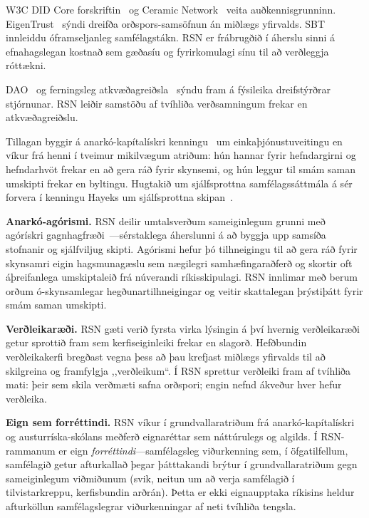 \documentclass[11pt,a4paper,twocolumn]{article}
\begin{document}
W3C DID Core forskriftin~\cite{did2022} og Ceramic Network~\cite{ceramic2023} veita auðkennisgrunninn. EigenTrust~\cite{kamvar2003} sýndi dreifða orðspors-samsöfnun án miðlægs yfirvalds. SBT~\cite{weyl2022} innleiddu óframseljanleg samfélagstákn. RSN er frábrugðið í áherslu sinni á efnahagslegan kostnað sem gæðasíu og fyrirkomulagi sínu til að verðleggja róttækni.

DAO~\cite{buterin2014} og ferningsleg atkvæðagreiðsla~\cite{buterin2019} sýndu fram á fýsileika dreifstýrðrar stjórnunar. RSN leiðir samstöðu af tvíhliða verðsamningum frekar en atkvæðagreiðslu.

Tillagan byggir á anarkó-kapítalískri kenningu~\cite{rothbard1973,hoppe2001} um einkaþjónustuveitingu en víkur frá henni í tveimur mikilvægum atriðum: hún hannar fyrir hefndargirni og hefndarhvöt frekar en að gera ráð fyrir skynsemi, og hún leggur til smám saman umskipti frekar en byltingu. Hugtakið um sjálfsprottna samfélagssáttmála á sér forvera í kenningu Hayeks um sjálfsprottna skipan~\cite{hayek1973}.

\textbf{Anarkó-agórismi.} RSN deilir umtalsverðum sameiginlegum grunni með agórískri gagnhagfræði~\cite{konkin2006}---sérstaklega áherslunni á að byggja upp samsíða stofnanir og sjálfviljug skipti. Agórismi hefur þó tilhneigingu til að gera ráð fyrir skynsamri eigin hagsmunagæslu sem nægilegri samhæfingaraðferð og skortir oft áþreifanlega umskiptaleið frá núverandi ríkisskipulagi. RSN innlimar með berum orðum ó-skynsamlegar hegðunartilhneigingar og veitir skattalegan þrýstiþátt fyrir smám saman umskipti.

\textbf{Verðleikaræði.} RSN gæti verið fyrsta virka lýsingin á því hvernig verðleikaræði~\cite{young1958} getur sprottið fram sem kerfiseiginleiki frekar en slagorð. Hefðbundin verðleikakerfi bregðast vegna þess að þau krefjast miðlægs yfirvalds til að skilgreina og framfylgja ,,verðleikum``. Í RSN sprettur verðleiki fram af tvíhliða mati: þeir sem skila verðmæti safna orðspori; engin nefnd ákveður hver hefur verðleika.

\textbf{Eign sem forréttindi.} RSN víkur í grundvallaratriðum frá anarkó-kapítalískri og austurríska-skólans meðferð eignaréttar sem náttúrulegs og algilds. Í RSN-rammanum er eign \emph{forréttindi}---samfélagsleg viðurkenning sem, í öfgatilfellum, samfélagið getur afturkallað þegar þátttakandi brýtur í grundvallaratriðum gegn sameiginlegum viðmiðunum (svik, neitun um að verja samfélagið í tilvistarkreppu, kerfisbundin arðrán). Þetta er ekki eignaupptaka ríkisins heldur afturköllun samfélagslegrar viðurkenningar af neti tvíhliða tengsla.
\end{document}
